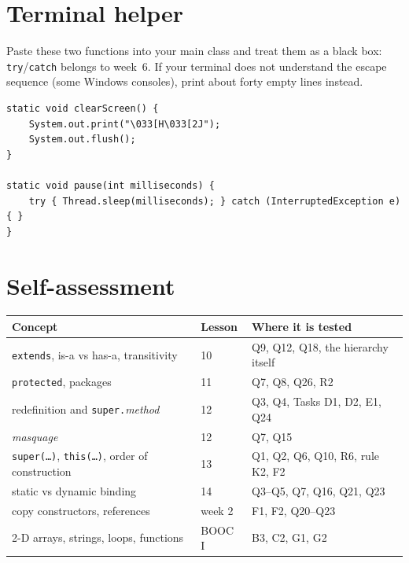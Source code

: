 \documentclass[11pt,a4paper]{article}
\newcommand{\code}[1]{\texttt{#1}}
\begin{document}
\section{Terminal helper}\label{app:helper}

Paste these two functions into your main class and treat them as a black box: \code{try}/\code{catch}
belongs to week~6. If your terminal does not understand the escape sequence (some Windows
consoles), print about forty empty lines instead.
\begin{lstlisting}
static void clearScreen() {
    System.out.print("\033[H\033[2J");
    System.out.flush();
}

static void pause(int milliseconds) {
    try { Thread.sleep(milliseconds); } catch (InterruptedException e) { }
}
\end{lstlisting}

\section{Self-assessment}

\begin{center}
\small
\begin{tabular}{@{}>{\raggedright}p{5.4cm}l>{\raggedright\arraybackslash}p{6.4cm}@{}}
\toprule
Concept & Lesson & Where it is tested \\
\midrule
\code{extends}, is-a vs has-a, transitivity & 10 & Q9, Q12, Q18, the hierarchy itself \\
\code{protected}, packages & 11 & Q7, Q8, Q26, R2 \\
redefinition and \code{super.}\emph{method} & 12 & Q3, Q4, Tasks D1, D2, E1, Q24 \\
\emph{masquage} & 12 & Q7, Q15 \\
\code{super(\ldots)}, \code{this(\ldots)}, order of construction & 13 & Q1, Q2, Q6, Q10, R6, rule K2, F2 \\
static vs dynamic binding & 14 & Q3--Q5, Q7, Q16, Q21, Q23 \\
copy constructors, references & week 2 & F1, F2, Q20--Q23 \\
2-D arrays, strings, loops, functions & BOOC I & B3, C2, G1, G2 \\
\bottomrule
\end{tabular}
\end{center}
\end{document}
